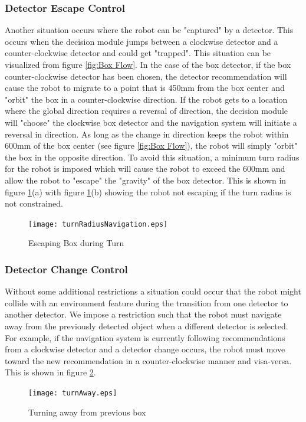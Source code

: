\documentclass[journal]{IEEEtran}
\begin{document}
\subsubsection{Detector Escape Control}
\label{sec:Detector Escape Control}
Another situation occurs where the robot can be "captured" by a detector. This occurs when the decision module jumps between
a clockwise detector and a counter-clockwise detector and could get "trapped".
This situation can be visualized from figure \ref{fig:Box Flow}.
In the case of the box detector, if the box counter-clockwise detector has been chosen, the detector recommendation will cause the robot to migrate to a
point that is 450mm from the box center and "orbit" the box in a counter-clockwise direction.
If the robot gets to a location where the global direction requires a reversal of direction, the decision module will "choose" the clockwise box detector
and the navigation system will initiate a reversal in direction. As long as the change in direction keeps the robot within 600mm of the box center (see figure \ref{fig:Box Flow}), the robot will
simply "orbit" the box in the opposite direction. To avoid this situation, a minimum turn radius for the robot is imposed which will cause the robot to exceed the 600mm
and allow the robot to "escape" the "gravity" of the box detector.  This is shown in figure \ref{fig:Turn Radius Navigation}(a) with figure \ref{fig:Turn Radius Navigation}(b) showing
the robot not escaping if the turn radius is not constrained.
\begin{figure}[!t]
\centerline{
\mbox{\texttt{[image: turnRadiusNavigation.eps]}}
}
\caption{Escaping Box during Turn}
\label{fig:Turn Radius Navigation}
\end{figure}

\subsubsection{Detector Change Control}
\label{sec:Detector Change Control}
Without some additional restrictions a situation could occur that the robot might collide with an environment feature during the transition
from one detector to another detector.
We impose a restriction such that the robot must navigate away from the previously detected object when a different detector is selected.
For example, if the navigation system is currently following recommendations from a clockwise detector and a detector change occurs,
the robot must move toward the new recommendation in a counter-clockwise manner and visa-versa. This is shown in figure \ref{fig:Turning Away}.
\begin{figure}[!t]
\centerline{
\mbox{\texttt{[image: turnAway.eps]}}
}
\caption{Turning away from previous box}
\label{fig:Turning Away}
\end{figure}
\end{document}
